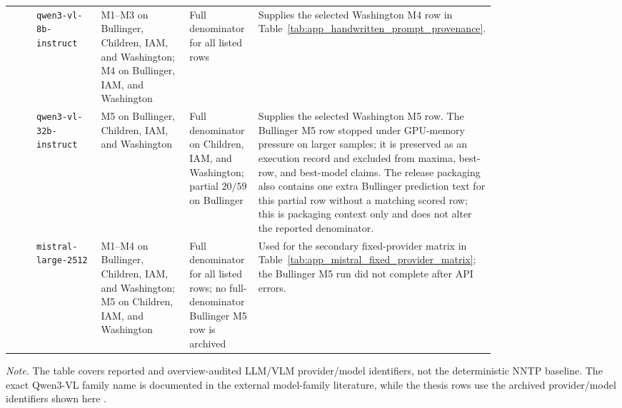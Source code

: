 \begin{landscape}
\begin{table}[p]
\begin{tabularx}{\linewidth}{@{}>{\raggedright\arraybackslash}p{0.13\linewidth}>{\raggedright\arraybackslash}p{0.20\linewidth}>{\raggedright\arraybackslash}p{0.30\linewidth}>{\raggedright\arraybackslash}p{0.16\linewidth}Y@{}}
    \QwenEightShort{} & \texttt{qwen3-vl-8b-instruct} & M1--M3 on Bullinger, Children, IAM, and Washington; M4 on Bullinger, IAM, and Washington & Full denominator for all listed rows & Supplies the selected Washington M4 row in Table~\ref{tab:app_handwritten_prompt_provenance}. \\
    \QwenThirtyTwoShort{} & \texttt{qwen3-vl-32b-instruct} & M5 \contextHundred{} on Bullinger, Children, IAM, and Washington & Full denominator on Children, IAM, and Washington; partial \(20/59\) on Bullinger & Supplies the selected Washington M5 row. The Bullinger M5 row stopped under GPU-memory pressure on larger samples; it is preserved as an execution record and excluded from maxima, best-row, and best-model claims. The release packaging also contains one extra Bullinger prediction text for this partial row without a matching scored row; this is packaging context only and does not alter the reported denominator. \\
    \MistralLargeShort{} & \texttt{mistral-large-2512} & M1--M4 on Bullinger, Children, IAM, and Washington; M5 \contextHundred{} on Children, IAM, and Washington & Full denominator for all listed rows; no full-denominator Bullinger M5 row is archived & Used for the secondary fixed-provider matrix in Table~\ref{tab:app_mistral_fixed_provider_matrix}; the Bullinger M5 run did not complete after API errors. \\
    \bottomrule
  \end{tabularx}
  \vspace{0.35em}

  \parbox{0.96\linewidth}{\footnotesize\raggedright \textit{Note.} The table covers reported and overview-audited LLM/VLM provider/model identifiers, not the deterministic NNTP baseline. The exact Qwen3-VL family name is documented in the external model-family literature, while the thesis rows use the archived provider/model identifiers shown here .}
\end{table}
\end{landscape}

